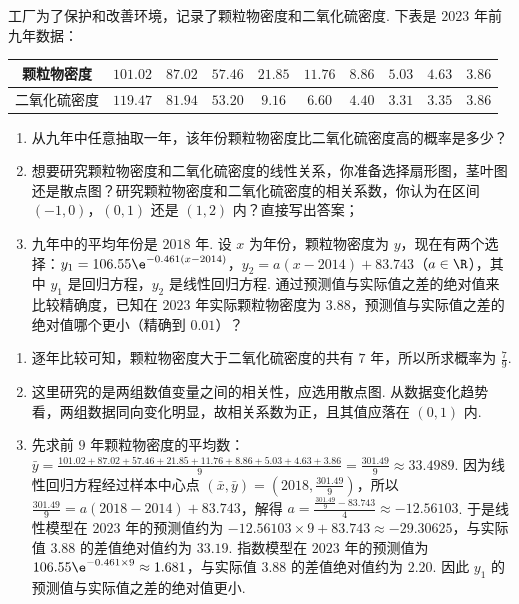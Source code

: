 \documentclass[UTF8,a4paper,oneside,11pt]{ctexbook}
\begin{document}
\begin{problem}
工厂为了保护和改善环境，记录了颗粒物密度和二氧化硫密度. 下表是 \( 2023 \) 年前九年数据：

\begin{center}
\renewcommand{\arraystretch}{1.25}
\begin{tabular}{|c|c|c|c|c|c|c|c|c|c|}
\hline
颗粒物密度 & \(101.02\) & \(87.02\) & \(57.46\) & \(21.85\) & \(11.76\) & \(8.86\) & \(5.03\) & \(4.63\) & \(3.86\) \\
\hline
二氧化硫密度 & \(119.47\) & \(81.94\) & \(53.20\) & \(9.16\) & \(6.60\) & \(4.40\) & \(3.31\) & \(3.35\) & \(3.86\) \\
\hline
\end{tabular}
\end{center}

\begin{enumerate}
\item 从九年中任意抽取一年，该年份颗粒物密度比二氧化硫密度高的概率是多少？
\item 想要研究颗粒物密度和二氧化硫密度的线性关系，你准备选择扇形图，茎叶图还是散点图？研究颗粒物密度和二氧化硫密度的相关系数，你认为在区间 \((-1,0)\)，\((0,1)\) 还是 \((1,2)\) 内？直接写出答案；
\item 九年中的平均年份是 \( 2018 \) 年. 设 \( x \) 为年份，颗粒物密度为 \( y \)，现在有两个选择：\( y_1=106.55\e^{-0.461\left( x-2014 \right)} \)，\( y_2=a\left( x-2014 \right)+83.743 \)（\( a\in\R \)），其中 \( y_1 \) 是回归方程，\( y_2 \) 是线性回归方程. 通过预测值与实际值之差的绝对值来比较精确度，已知在 \( 2023 \) 年实际颗粒物密度为 \( 3.88 \)，预测值与实际值之差的绝对值哪个更小（精确到 \( 0.01 \)）？
\end{enumerate}
\end{problem}

\begin{solution}
\begin{enumerate}
\item 逐年比较可知，颗粒物密度大于二氧化硫密度的共有 \( 7 \) 年，所以所求概率为 \( \frac{7}{9} \).

\item 这里研究的是两组数值变量之间的相关性，应选用散点图. 从数据变化趋势看，两组数据同向变化明显，故相关系数为正，且其值应落在 \( \left( 0,1 \right) \) 内.

\item 先求前 \( 9 \) 年颗粒物密度的平均数：\( \bar y=\frac{101.02+87.02+57.46+21.85+11.76+8.86+5.03+4.63+3.86}{9}=\frac{301.49}{9}\approx33.4989 \). 因为线性回归方程经过样本中心点 \( \left( \bar x,\bar y \right)=\left( 2018,\frac{301.49}{9} \right) \)，所以 \( \frac{301.49}{9}=a\left( 2018-2014 \right)+83.743 \)，解得 \( a=\frac{\frac{301.49}{9}-83.743}{4}\approx-12.56103 \). 于是线性模型在 \( 2023 \) 年的预测值约为 \( -12.56103\times 9+83.743\approx-29.30625 \)，与实际值 \( 3.88 \) 的差值绝对值约为 \( 33.19 \). 指数模型在 \( 2023 \) 年的预测值为 \( 106.55\e^{-0.461\times 9}\approx1.681 \)，与实际值 \( 3.88 \) 的差值绝对值约为 \( 2.20 \). 因此 \( y_1 \) 的预测值与实际值之差的绝对值更小.
\end{enumerate}
\end{solution}
\end{document}
